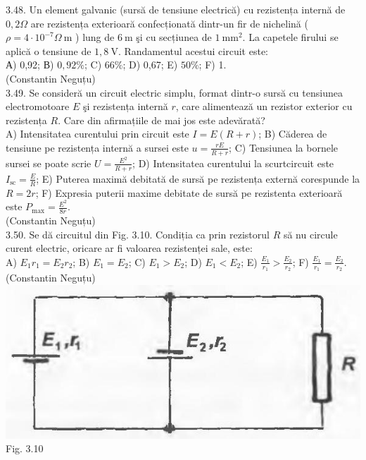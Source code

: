 \documentclass[10pt]{article}
\begin{document}
3.48. Un element galvanic (sursă de tensiune electrică) cu rezistența internă de $0,2 \Omega$ are rezistența exterioară confecționată dintr-un fir de nichelină ( $\rho=4 \cdot 10^{-7} \Omega \mathrm{~m}$ ) lung de $6 \mathrm{~m}$ şi cu secțiunea de $1 \mathrm{~mm}^{2}$. La capetele firului se aplică o tensiune de $1,8 \mathrm{~V}$. Randamentul acestui circuit este:\\ А) 0,92; В) $0,92 \%$; C) $66 \%$; D) 0,67; E) $50 \%$; F) 1.\\ (Constantin Neguțu)\\

3.49. Se consideră un circuit electric simplu, format dintr-o sursă cu tensiunea electromotoare $E$ şi rezistența internă $r$, care alimentează un rezistor exterior cu rezistența $R$. Care din afirmațiile de mai jos este adevărată?\\ A) Intensitatea curentului prin circuit este $I=E(R+r)$; B) Căderea de tensiune pe rezistența internă a sursei este $u=\frac{r E}{R+r}$; C) Tensiunea la bornele sursei se poate scrie $U=\frac{E^{2}}{R+r}$; D) Intensitatea curentului la scurtcircuit este $I_{\mathrm{sc}}=\frac{E}{R}$; E) Puterea maximă debitată de sursă pe rezistența externă corespunde la $R=2 r$; F) Expresia puterii maxime debitate de sursă pe rezistenta exterioară este $P_{\max }=\frac{E^{2}}{8 r}$.\\ (Constantin Neguțu)\\

3.50. Se dă circuitul din Fig. 3.10. Condiția ca prin rezistorul $R$ să nu circule curent electric, oricare ar fi valoarea rezistenței sale, este:\\ A) $E_{1} r_{1}=E_{2} r_{2}$; B) $E_{1}=E_{2}$; C) $E_{1}>E_{2}$; D) $E_{1}<E_{2}$; E) $\frac{E_{1}}{r_{1}}>\frac{E_{2}}{r_{2}}$; F) $\frac{E_{1}}{r_{1}}=\frac{E_{2}}{r_{2}}$.\\ (Constantin Neguțu)\\ \includegraphics[max width=\textwidth, center]{2025_07_01_5b3ff9fa0d508c8e9f17g-154} Fig. 3.10\\
\end{document}
